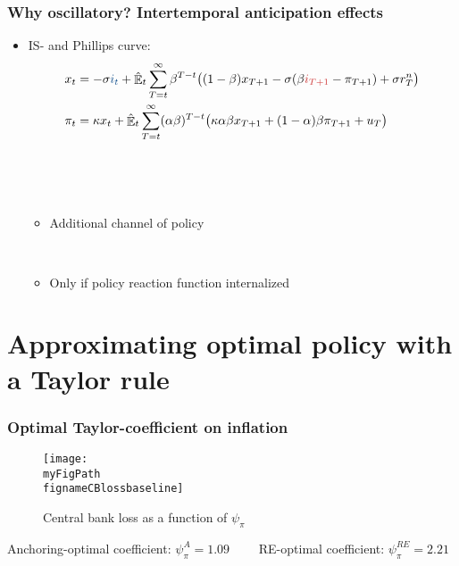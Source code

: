 \documentclass[10pt]{beamer}
\def \myFigPath {../../../figures/}
\DeclareMathOperator{\E}{\mathbb{E}}
\def\fignameCBlossbaseline{plot_sim_loss_approx_pretty_losses_again_critsmooth_constant_only_pi_only_lamx0_05_lami0_2020_09_19}
\begin{document}
\begin{frame}
	\frametitle{Why oscillatory? Intertemporal anticipation effects}
\begin{itemize}
\item[] IS- and Phillips curve:	
 \begin{align*}
x_t &=  -\sigma \textcolor{dodgerblue}{i_t} +\hat{\E}_t \sum_{T=t}^{\infty} \beta^{T-t }\big( (1-\beta)x_{T+1} - \sigma(\beta \textcolor{brownreddark}{i_{T+1}} - \pi_{T+1}) +\sigma r_T^n \big)   \\
\pi_t &= \kappa x_t +\hat{\E}_t \sum_{T=t}^{\infty} (\alpha\beta)^{T-t }\big( \kappa \alpha \beta x_{T+1} + (1-\alpha)\beta \pi_{T+1} + u_T\big) 
\end{align*}

\

\

\pause 

\begin{itemize}
\item  \textcolor{brownreddark}{Additional channel of policy}

\

\pause 
\item  \textcolor{brownreddark}{Only if policy reaction function internalized}
\end{itemize}




\end{itemize}



\end{frame}

\section{Approximating optimal policy with a Taylor rule}

\begin{frame}
	\frametitle{Optimal Taylor-coefficient on inflation}
	
\begin{figure}[h!]
\caption{Central bank loss as a function of $\psi_{\pi}$}
\texttt{[image: \\myFigPath \\fignameCBlossbaseline]}
\end{figure} 


\small{
Anchoring-optimal coefficient: $\psi_{\pi}^A =1.09 \quad \quad $ RE-optimal coefficient: $\psi_{\pi}^{RE} =2.21$
}


\end{frame}
\end{document}

